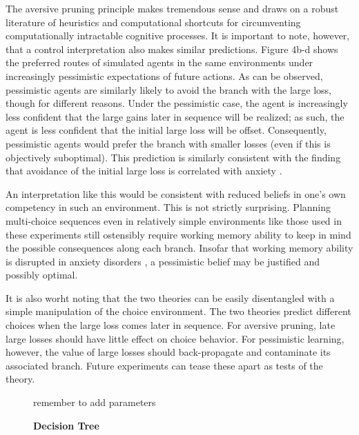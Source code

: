 \documentclass[11pt]{article} %
\begin{document}
The aversive pruning principle makes tremendous sense and draws on a robust literature
of heuristics and computational shortcuts for circumventing computationally intractable
cognitive processes. It is important to note, however, that a control interpretation
also makes similar predictions. Figure 4b-d shows the preferred routes of simulated
agents in the same environments under increasingly pessimistic expectations of
future actions. As can be observed, pessimistic agents are similarly likely to avoid
the branch with the large loss, though for different reasons. Under the pessimistic case,
the agent is increasingly less confident that the large gains later in
sequence will be realized; as such, the agent is less confident that the initial
large loss will be offset. Consequently, pessimistic agents would prefer the branch
with smaller losses (even if this is objectively suboptimal). This prediction
is similarly consistent with the finding that avoidance of the initial large loss
is correlated with anxiety \cite{Lally2017}.

An interpretation like this would be consistent with reduced beliefs in one's
own competency in such an environment. This is not strictly surprising. Planning
multi-choice sequences even in relatively simple environments like those used
in these experiments still ostensibly require working memory ability to keep in
mind the possible consequences along each branch. Insofar that working memory
ability is disrupted in anxiety disorders \citep{Moran2016}, a pessimistic belief
may be justified and possibly optimal.

It is also worht noting that the two theories can be easily disentangled with a
simple manipulation of the choice environment. The two theories predict
different choices when the large loss comes later in sequence. For aversive pruning,
late large losses should have little effect on choice behavior. For pessimistic
learning, however, the value of large losses should back-propagate and contaminate
its associated branch. Future experiments can tease these apart as tests of the theory.

\begin{figure}
  \centerline{%
  }
  \caption{\textbf{Decision Tree}}
  \par remember to add parameters
\end{figure}
\end{document}
